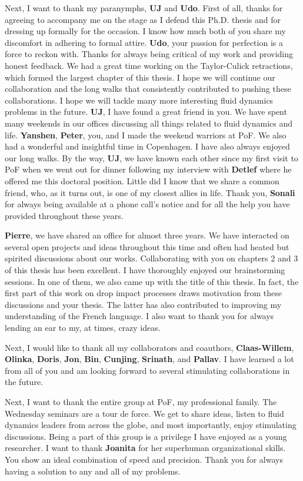 Next, I want to thank my paranymphs, {\bf UJ} and {\bf Udo}. First of all, thanks for agreeing to accompany me on the stage as I defend this Ph.D. thesis and for dressing up formally for the occasion. I know how much both of you share my discomfort in adhering to formal attire. {\bf Udo}, your passion for perfection is a force to reckon with. Thanks for always being critical of my work and providing honest feedback. We had a great time working on the Taylor-Culick retractions, which formed the largest chapter of this thesis. I hope we will continue our collaboration and the long walks that consistently contributed to pushing these collaborations. I hope we will tackle many more interesting fluid dynamics problems in the future. {\bf UJ}, I have found a great friend in you. We have spent many weekends in our offices discussing all things related to fluid dynamics and life. {\bf Yanshen}, {\bf Peter}, you, and I made the weekend warriors at PoF. We also had a wonderful and insightful time in Copenhagen. I have also always enjoyed our long walks. By the way, {\bf UJ}, we have known each other since my first visit to PoF when we went out for dinner following my interview with {\bf Detlef} where he offered me this doctoral position. Little did I know that we share a common friend, who, as it turns out, is one of my closest allies in life. Thank you, {\bf Sonali} for always being available at a phone call's notice and for all the help you have provided throughout these years.

{\bf Pierre}, we have shared an office for almost three years. We have interacted on several open projects and ideas throughout this time and often had heated but spirited discussions about our works. Collaborating with you on chapters 2 and 3 of this thesis has been excellent. I have thoroughly enjoyed our brainstorming sessions. In one of them, we also came up with the title of this thesis. In fact, the first part of this work on drop impact processes draws motivation from these discussions and your thesis. The latter has also contributed to improving my understanding of the French language. I also want to thank you for always lending an ear to my, at times, crazy ideas. 

Next, I would like to thank all my collaborators and coauthors, {\bf Claas-Willem}, {\bf Olinka}, {\bf Doris}, {\bf Jon}, {\bf Bin}, {\bf Cunjing}, {\bf Srinath}, and {\bf Pallav}. I have learned a lot from all of you and am looking forward to several stimulating collaborations in the future. 

Next, I want to thank the entire group at PoF, my professional family. The Wednesday seminars are a tour de force. We get to share ideas, listen to fluid dynamics leaders from across the globe, and most importantly, enjoy stimulating discussions. Being a part of this group is a privilege I have enjoyed as a young researcher. I want to thank {\bf Joanita} for her superhuman organizational skills. You show an ideal combination of speed and precision. Thank you for always having a solution to any and all of my problems. 

